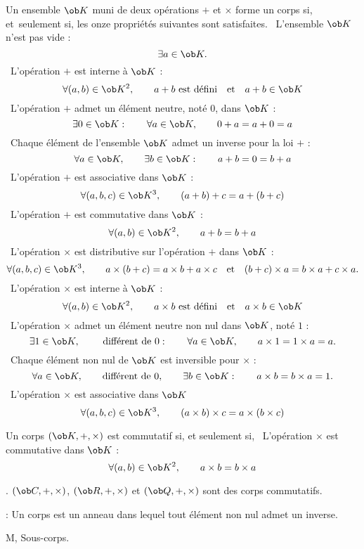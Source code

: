 \Definition Un ensemble $\ob K$ muni de deux opérations $+$ et $\times$ 
forme un corps si, et~seulement si, les onze propriétés suivantes sont satisfaites.
\bigskip
\noindent\qquad{}\ L'ensemble $\ob K$ n'est pas vide : 
$$
\exists a\in \ob K.
$$ 
\noindent\qquad{}\ L'opération $+$ est interne à $\ob K$ : 
$$
\forall (a,b)\in \ob K^2, \qquad a+b\mbox{ est défini}\quad\mbox{et}\quad a+b\in \ob K
$$
\noindent\qquad{}\ L'opération $+$ admet un élément neutre, noté $0$, dans $\ob K$ : 
$$
\exists 0\in \ob K:\qquad \forall a\in \ob K,\qquad 0+a=a+0=a
$$
\noindent\qquad{}\ Chaque élément de l'ensemble $\ob K$ admet un inverse pour la loi $+$ : 
$$
\forall a\in \ob K, \qquad \exists b\in \ob K:\qquad a+b=0=b+a
$$
\noindent\qquad{}\ L'opération $+$ est associative dans $\ob K$ :
$$
\forall (a,b,c)\in \ob K^3, \qquad(a+b)+c=a+(b+c)
$$ 
\noindent\qquad{}\ L'opération $+$ est commutative dans $\ob K$ : 
$$
\forall (a,b)\in \ob K^2, \qquad a+b=b+a
$$
\noindent\qquad{}\ L'opération $\times$ est distributive sur l'opération $+$ dans $\ob K$ : 
$$
\forall(a,b,c)\in \ob K^3, \qquad a\times(b+c)=a\times b+a\times c\quad\mbox{et}\quad (b+c)\times a=b\times a+c\times a.
$$ 
\noindent\qquad{}\ L'opération $\times$ est interne à $\ob K$ : 
$$
\forall (a,b)\in \ob K^2,\qquad a\times b\mbox{ est défini}\quad \mbox{et}\quad a\times b\in \ob K
$$
\noindent\qquad{}\ L'opération $\times$ admet un élément neutre non nul dans $\ob K$, noté $1$ :
$$
\exists 1\in \ob K, \qquad\mbox{ différent de }0: \qquad \forall a\in \ob K, \qquad a\times1=1\times a=a.
$$ 
\noindent\qquad{}\ Chaque élément non nul de $\ob K$ est inversible pour $\times$ : 
$$
\forall a\in \ob K, \qquad\mbox{différent de }0, \qquad \exists b\in \ob K:\qquad a\times b=b\times a=1. 
$$
\noindent\qquad{}\ L'opération $\times$ est associative dans $\ob K$
$$
\forall (a,b,c)\in \ob K^3, \qquad(a\times b)\times c=a\times(b\times c)
$$


\Definition []  Un corps $(\ob K,+,\times)$ est commutatif si, et seulement si, 
\noindent\qquad{}\ L'opération $\times$ est commutative dans $\ob K$ : 
$$
\forall (a,b)\in \ob K^2, \qquad a\times b=b\times a
$$

\Exemples. $(\ob C,+,\times)$, $(\ob R,+,\times)$ et $(\ob Q, +,\times)$ sont des corps commutatifs. 
\bigskip


\Remarque : Un corps est un anneau dans lequel tout élément non nul admet un inverse. 
\bigskip

                                                                                                  
\Subsection M, Sous-corps. 


